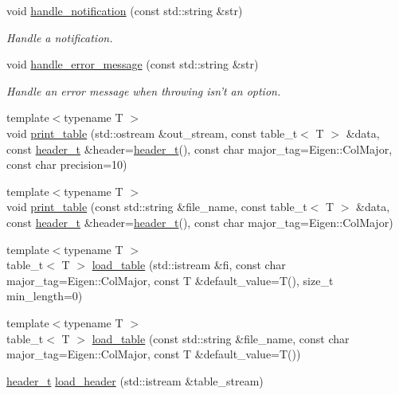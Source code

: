 \begin{DoxyCompactItemize}
void \hyperlink{namespaceIceBRG_ab990faa42b7ef106893de947760421ce}{handle\-\_\-notification} (const std\-::string \&str)
\begin{DoxyCompactList}\small\item\em Handle a notification. \end{DoxyCompactList}\item 
void \hyperlink{namespaceIceBRG_a6f24276adcb82f30036bdef384bf674e}{handle\-\_\-error\-\_\-message} (const std\-::string \&str)
\begin{DoxyCompactList}\small\item\em Handle an error message when throwing isn't an option. \end{DoxyCompactList}\item 
{\footnotesize template$<$typename T $>$ }\\void \hyperlink{namespaceIceBRG_ae53d90be96da8318b9d62188970ce1d7}{print\-\_\-table} (std\-::ostream \&out\-\_\-stream, const table\-\_\-t$<$ T $>$ \&data, const \hyperlink{namespaceIceBRG_a49e8b48f1dbd351e9748e7cbe80705df}{header\-\_\-t} \&header=\hyperlink{namespaceIceBRG_a49e8b48f1dbd351e9748e7cbe80705df}{header\-\_\-t}(), const char major\-\_\-tag=Eigen\-::\-Col\-Major, const char precision=10)
\item 
{\footnotesize template$<$typename T $>$ }\\void \hyperlink{namespaceIceBRG_ac15c03b00d4dc1d1fb843d1c5e8f9b01}{print\-\_\-table} (const std\-::string \&file\-\_\-name, const table\-\_\-t$<$ T $>$ \&data, const \hyperlink{namespaceIceBRG_a49e8b48f1dbd351e9748e7cbe80705df}{header\-\_\-t} \&header=\hyperlink{namespaceIceBRG_a49e8b48f1dbd351e9748e7cbe80705df}{header\-\_\-t}(), const char major\-\_\-tag=Eigen\-::\-Col\-Major)
\item 
{\footnotesize template$<$typename T $>$ }\\table\-\_\-t$<$ T $>$ \hyperlink{namespaceIceBRG_ae243e8ce14d6e346cceab63a4d76637a}{load\-\_\-table} (std\-::istream \&fi, const char major\-\_\-tag=Eigen\-::\-Col\-Major, const T \&default\-\_\-value=T(), size\-\_\-t min\-\_\-length=0)
\item 
{\footnotesize template$<$typename T $>$ }\\table\-\_\-t$<$ T $>$ \hyperlink{namespaceIceBRG_ac978c55b40895ee8d5d3731532e4b1c7}{load\-\_\-table} (const std\-::string \&file\-\_\-name, const char major\-\_\-tag=Eigen\-::\-Col\-Major, const T \&default\-\_\-value=T())
\item 
\hyperlink{namespaceIceBRG_a49e8b48f1dbd351e9748e7cbe80705df}{header\-\_\-t} \hyperlink{namespaceIceBRG_a047b573042d337c558184344d9d7fae1}{load\-\_\-header} (std\-::istream \&table\-\_\-stream)

\end{DoxyCompactItemize}
